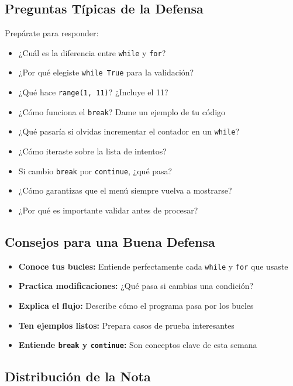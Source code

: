\documentclass[12pt,a4paper]{article}
\begin{document}
\subsection{Preguntas Típicas de la Defensa}

Prepárate para responder:

\begin{itemize}[leftmargin=*]
    \item ¿Cuál es la diferencia entre \texttt{while} y \texttt{for}?
    \item ¿Por qué elegiste \texttt{while True} para la validación?
    \item ¿Qué hace \texttt{range(1, 11)}? ¿Incluye el 11?
    \item ¿Cómo funciona el \texttt{break}? Dame un ejemplo de tu código
    \item ¿Qué pasaría si olvidas incrementar el contador en un \texttt{while}?
    \item ¿Cómo iteraste sobre la lista de intentos?
    \item Si cambio \texttt{break} por \texttt{continue}, ¿qué pasa?
    \item ¿Cómo garantizas que el menú siempre vuelva a mostrarse?
    \item ¿Por qué es importante validar antes de procesar?
\end{itemize}

\subsection{Consejos para una Buena Defensa}

\begin{itemize}[leftmargin=*]
    \item \textbf{Conoce tus bucles:} Entiende perfectamente cada \texttt{while} y \texttt{for} que usaste
    \item \textbf{Practica modificaciones:} ¿Qué pasa si cambias una condición?
    \item \textbf{Explica el flujo:} Describe cómo el programa pasa por los bucles
    \item \textbf{Ten ejemplos listos:} Prepara casos de prueba interesantes
    \item \textbf{Entiende \texttt{break} y \texttt{continue}:} Son conceptos clave de esta semana
\end{itemize}

\subsection{Distribución de la Nota}
\end{document}
